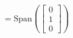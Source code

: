 \documentclass[preview]{standalone}
\begin{document}
\begin{align*}
= \text{Span}\left(\begin{bmatrix} 0 \\ 1 \\ 0 \end{bmatrix}\right)
\end{align*}
\end{document}
